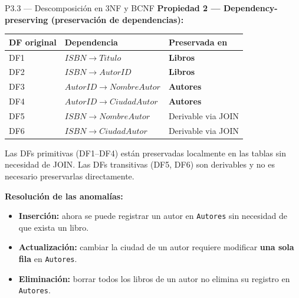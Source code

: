 \documentclass[12pt,a4paper]{article}
\begin{document}
\begin{querybox}{P3.3 --- Descomposición en 3NF y BCNF}
\vspace{0.5cm}
\textbf{Propiedad 2 --- Dependency-preserving (preservación de dependencias):}

\begin{center}
\begin{tabular}{lll}
  \toprule
  \textbf{DF original} & \textbf{Dependencia} & \textbf{Preservada en} \\
  \midrule
  DF1 & $ISBN \to Titulo$         & \textbf{Libros}  \\
  DF2 & $ISBN \to AutorID$        & \textbf{Libros}  \\
  DF3 & $AutorID \to NombreAutor$ & \textbf{Autores} \\
  DF4 & $AutorID \to CiudadAutor$ & \textbf{Autores} \\
  DF5 & $ISBN \to NombreAutor$    & Derivable via JOIN \\
  DF6 & $ISBN \to CiudadAutor$    & Derivable via JOIN \\
  \bottomrule
\end{tabular}
\end{center}

Las DFs primitivas (DF1--DF4) están preservadas localmente en las tablas
sin necesidad de JOIN. Las DFs transitivas (DF5, DF6) son derivables y
no es necesario preservarlas directamente.

\vspace{0.5cm}
\textbf{Resolución de las anomalías:}
\begin{itemize}[leftmargin=1.5em,itemsep=2pt]
  \item \textbf{Inserción:} ahora se puede registrar un autor en
        \texttt{Autores} sin necesidad de que exista un libro.
  \item \textbf{Actualización:} cambiar la ciudad de un autor requiere
        modificar \textbf{una sola fila} en \texttt{Autores}.
  \item \textbf{Eliminación:} borrar todos los libros de un autor
        no elimina su registro en \texttt{Autores}.
\end{itemize}

\end{querybox}
\end{document}

